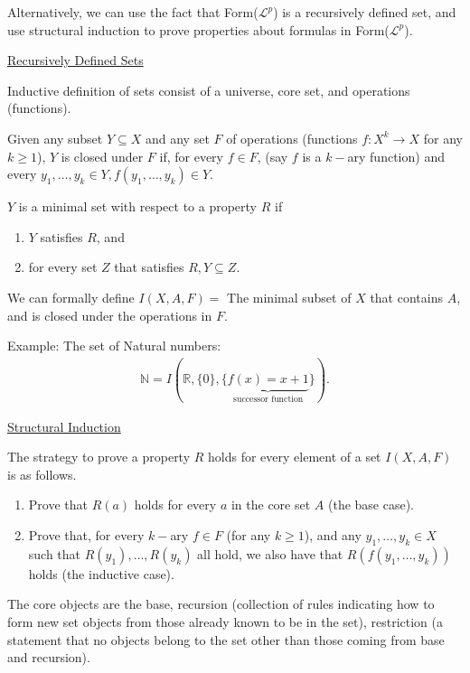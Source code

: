 \documentclass{article}
\begin{document}
Alternatively, we can use the fact that Form($\mathcal{L}^p$) is a recursively defined set, and use structural induction to prove properties about formulas in Form($\mathcal{L}^p$). 

\underline{Recursively Defined Sets}

Inductive definition of sets consist of a universe, core set, and operations (functions). 

Given any subset $Y \subseteq X$ and any set $F$ of operations (functions $f: X^k \to X$ for any $k \ge 1$), $Y$ is closed under $F$ if, for every $f \in F$, (say $f$ is a $k-$ary function) and every $y_1, \ldots, y_k \in Y, f(y_1, \ldots, y_k) \in Y$.

$Y$ is a minimal set with respect to a property $R$ if 
\begin{enumerate}
    \item $Y$ satisfies $R$, and 
    \item for every set $Z$ that satisfies $R, Y \subseteq Z$.
\end{enumerate}

We can formally define $I(X,A,F) = $ The minimal subset of $X$ that contains $A$, and is closed under the operations in $F$. 

Example: The set of Natural numbers:
\begin{align*}
\mathbb{N} = I \left ( \mathbb{R}, \{0\}, \{ \underbrace{f(x) = x + 1}_{\text{successor function}}\} \right ). 
\end{align*}

\underline{Structural Induction}

The strategy to prove a property $R$ holds for every element of a set $I(X,A,F)$ is as follows. 

\begin{enumerate}
    \item Prove that $R(a)$ holds for every $a$ in the core set $A$ (the base case). 
    \item Prove that, for every $k-$ary $f \in F$ (for any $k \ge 1$), and any $y_1, \ldots, y_k \in X$ such that $R(y_1), \ldots, R(y_k)$ all hold, we also have that $R(f(y_1, \ldots, y_k))$ holds (the inductive case).
\end{enumerate}

The core objects are the base, recursion (collection of rules indicating how to form new set objects from those already known to be in the set), restriction (a statement that no objects belong to the set other than those coming from base and recursion). 
\end{document}
